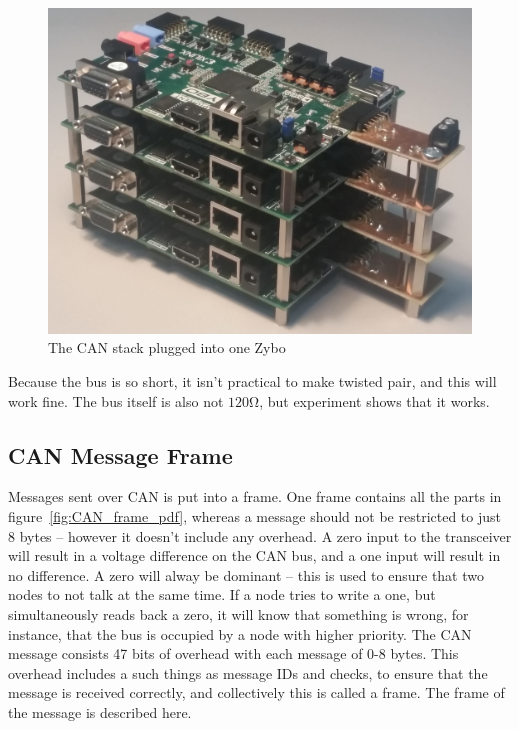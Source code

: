 \begin{figure}[H]
	\centering
	\includegraphics[width = 0.9\linewidth]{graphics/CAN_stack_picture}
	\caption{The CAN stack plugged into one Zybo}
	\label{fig:CAN_stack_picture}
\end{figure}

Because the bus is so short, it isn't practical to make twisted pair, and this will work fine.
The bus itself is also not $120 \si{\ohm}$, but experiment shows that it works.


\subsection{CAN Message Frame}\label{sub:CanMessageFrame}
Messages sent over CAN is put into a frame. 
One frame contains all the parts in figure~\ref{fig:CAN_frame_pdf}, whereas a message should not be restricted to just 8 bytes -- however it doesn't include any overhead.
A zero input to the transceiver will result in a voltage difference on the CAN bus, and a one input will result in no difference. 
A zero will alway be dominant -- this is used to ensure that two nodes to not talk at the same time.
If a node tries to write a one, but simultaneously reads back a zero, it will know that something is wrong, for instance, that the bus is occupied by a node with higher priority.
The CAN message consists 47 bits of overhead with each message of 0-8 bytes. 
This overhead includes a such things as message IDs and checks, to ensure that the message is received correctly, and collectively this is called a frame. 
The frame of the message is described here.


